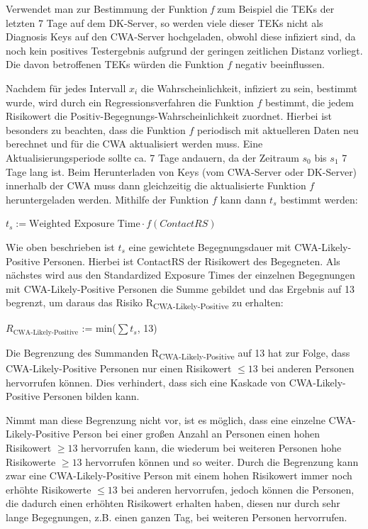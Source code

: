 \documentclass[conference,compsoc]{IEEEtran}
\begin{document}
Verwendet man zur Bestimmung der Funktion \textit{f} zum Beispiel die TEKs der letzten 7 Tage auf dem DK-Server, 
so werden viele dieser TEKs nicht als Diagnosis Keys auf den CWA-Server hochgeladen, 
obwohl diese infiziert sind, da noch kein positives Testergebnis aufgrund der geringen zeitlichen Distanz vorliegt. 
Die davon betroffenen TEKs würden die Funktion $f$ negativ beeinflussen.

Nachdem für jedes Intervall $x_i$ die Wahrscheinlichkeit, infiziert zu sein, bestimmt wurde, wird durch ein Regressionsverfahren die Funktion $f$ bestimmt, 
die jedem Risikowert die Positiv-Begegnungs-Wahrscheinlichkeit zuordnet. 
Hierbei ist besonders zu beachten, dass die Funktion $f$ periodisch mit aktuelleren Daten neu berechnet und für die CWA aktualisiert werden muss. 
Eine Aktualisierungsperiode sollte ca. 7 Tage andauern, da der Zeitraum $s_0$ bis $s_1$ 7 Tage lang ist.
Beim Herunterladen von Keys (vom CWA-Server oder DK-Server) innerhalb der CWA muss dann gleichzeitig die aktualisierte Funktion $f$ heruntergeladen werden. 
Mithilfe der Funktion $f$ kann dann $t_s$ bestimmt werden: 

\centerline{\text{ }}
\centerline{$t_s := \text{Weighted Exposure Time} \cdot f(ContactRS)$}
\centerline{\text{ }}

Wie oben beschrieben ist $t_s$ eine gewichtete Begegnungsdauer mit CWA-Likely-Positive Personen.
Hierbei ist ContactRS der Risikowert des Begegneten.
Als nächstes wird aus den Standardized Exposure Times der einzelnen Begegnungen mit CWA-Likely-Positive Personen die Summe gebildet und das Ergebnis auf 13 begrenzt, 
um daraus das Risiko R\textsubscript{CWA-Likely-Positive} zu erhalten:

\centerline{\text{ }}
\centerline{$R_{\text{CWA-Likely-Positive}}$ := min($\sum t_s$, 13)}
\centerline{\text{ }}

Die Begrenzung des Summanden R\textsubscript{CWA-Likely-Positive} auf 13 hat zur Folge, 
dass CWA-Likely-Positive Personen nur einen Risikowert $\le 13$ bei anderen Personen hervorrufen können. 
Dies verhindert, dass sich eine Kaskade von CWA-Likely-Positive Personen bilden kann. 

Nimmt man diese Begrenzung nicht vor, ist es möglich, 
dass eine einzelne CWA-Likely-Positive Person bei einer großen Anzahl an Personen einen hohen Risikowert $\geq 13$ hervorrufen kann, 
die wiederum bei weiteren Personen hohe Risikowerte $\geq 13$ hervorrufen können und so weiter. 
Durch die Begrenzung kann zwar eine CWA-Likely-Positive Person mit einem hohen Risikowert immer noch erhöhte Risikowerte $\leq 13$ bei anderen hervorrufen, 
jedoch können die Personen, die dadurch einen erhöhten Risikowert erhalten haben, 
diesen nur durch sehr lange Begegnungen, z.B. einen ganzen Tag, bei weiteren Personen hervorrufen.\\
\end{document}
